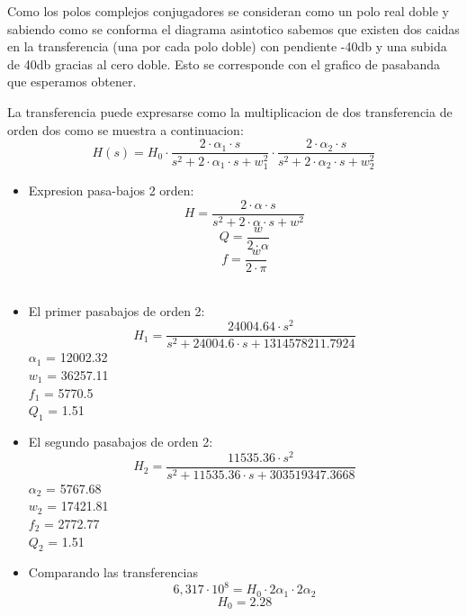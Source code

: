 \documentclass[11pt]{diazessay} %
\begin{document}
Como los polos complejos conjugadores se consideran como un polo real doble y sabiendo como se conforma el diagrama asintotico sabemos que existen
dos caidas en la transferencia (una por cada polo doble) con pendiente -40db y una subida de 40db gracias al cero doble. Esto se corresponde con el
grafico de pasabanda que esperamos obtener.

La transferencia puede expresarse como la multiplicacion de dos transferencia de orden dos como se muestra a continuacion:
\begin{equation}
H(s) = H_{0} \cdot \frac{ 2 \cdot \alpha_{1} \cdot s }{ s^2 + 2 \cdot \alpha_{1} \cdot s + w_{1}^2} \cdot \frac{ 2 \cdot \alpha_{2} \cdot s }{ s^2 + 2 \cdot \alpha_{2} \cdot s + w_{2}^2}
\end{equation}
\begin{itemize}
\item Expresion pasa-bajos 2 orden:
\begin{equation}
H = \frac{ 2 \cdot \alpha \cdot s }{ s^2 + 2 \cdot \alpha \cdot s + w^2}
\end{equation}
\begin{equation}
Q = \frac{w}{2 \cdot \alpha}
\end{equation}
\begin{equation}
f = \frac{w}{2 \cdot \pi}
\end{equation}\\
\item El primer pasabajos de orden 2:
\begin{equation}
H_{1} = \frac{24004.64 \cdot s^2}{s^2 + 24004.6 \cdot s + 1314578211.7924} 
\end{equation}
$\alpha_{1}$ = 12002.32\\
$w_{1}$ = 36257.11\\
$f_{1}$ = 5770.5\\
$Q_{1}$ = 1.51\\
\item El segundo pasabajos de orden 2:
\begin{equation}
H_{2} = \frac{11535.36 \cdot s^2}{s^2 +11535.36 \cdot s + 303519347.3668} 
\end{equation}
$\alpha_{2}$ = 5767.68\\
$w_{2}$ = 17421.81\\
$f_{2}$ = 2772.77\\
$Q_{2}$ = 1.51\\
\item Comparando las transferencias
\begin{equation}
6,317 \cdot 10^8 = H_{0} \cdot 2\alpha_{1} \cdot 2\alpha_{2}
\end{equation}
\begin{equation}
H_{0} = 2.28
\end{equation}
\end{itemize}
\end{document}
